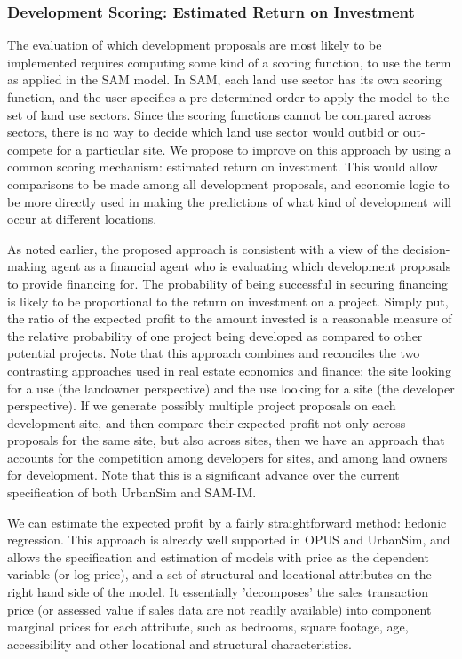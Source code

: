 \subsubsection{Development Scoring: Estimated Return on Investment}
The evaluation of which development proposals are most likely to be implemented requires
computing some kind of a scoring function, to use the term as applied in the SAM model.  In SAM,
each land use sector has its own scoring function, and the user specifies a pre-determined order
to apply the model to the set of land use sectors.  Since the scoring functions cannot be compared
across sectors, there is no way to decide which land use sector would outbid or out-compete for
a particular site.  We propose to improve on this approach by using a common scoring mechanism:
estimated return on investment.  This would allow comparisons to be made among all development
proposals, and economic logic to be more directly used in making the predictions of what kind of
development will occur at different locations.

As noted earlier, the proposed approach is consistent with a view of the decision-making agent as
a financial agent who is evaluating which development proposals to provide financing for.  The 
probability of being successful in securing financing is likely to be proportional
to the return on investment on a project.  Simply put, the ratio of the expected profit to the amount
invested is a reasonable measure of the relative
probability of one project being developed as compared to other potential projects.  Note that this
approach combines and reconciles the two contrasting approaches used in real estate economics and
finance: the site looking for a use (the landowner perspective) and the use looking for a site (the developer 
perspective).  If we generate possibly multiple project proposals on each development site,
and then compare their expected profit not only across proposals for the same site, but also across
sites, then we have an approach that accounts for the competition among developers for sites, and
among land owners for development.  Note that this is a significant advance over the current
specification of both UrbanSim and SAM-IM.

We can estimate the expected profit by a fairly straightforward method: hedonic regression.  This
approach is already well supported in OPUS and UrbanSim, and allows the specification and estimation
of models with price as the dependent variable (or log price), and a set of structural and locational
attributes on the right hand side of the model.  It essentially 'decomposes' the sales transaction
price (or assessed value if sales data are not readily available) into component marginal prices for
each attribute, such as bedrooms, square footage, age, accessibility and other locational
and structural characteristics.

